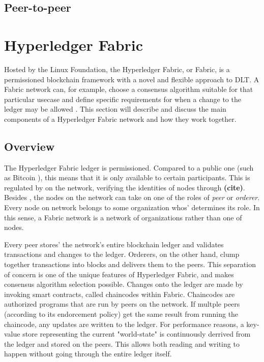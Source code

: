 \documentclass[english, biblatex, digitaloutput]{kththesis}
\begin{document}



\subsection{Peer-to-peer}






\section{Hyperledger Fabric}

Hosted by the Linux Foundation\cite{linux-foundation_projects_nodate}, the Hyperledger Fabric, or Fabric, is a permissioned blockchain framework with a novel and flexible approach to \gls{DLT}. A Fabric network can, for example, choose a consensus algorithm suitable for that particular usecase and define specific requirements for when a change to the ledger may be allowed \cite{androulaki_hyperledger_2018}. This section will describe and discuss the main components of a Hyperledger Fabric network and how they work together.

\subsection{Overview}

The Hyperledger Fabric ledger is permissioned. Compared to a public one (such as Bitcoin \cite{nakamoto_bitcoin_nodate}), this means that it is only available to certain participants. This is regulated by  on the network, verifying the identities of nodes through  \textbf{(cite)}. Besides , the nodes on the network can take on one of the roles of \textit{peer} or \textit{orderer}. Every node on network belongs to some organization whos'  determines its role. In this sense, a Fabric network is a network of organizations rather than one of nodes.

Every peer stores' the network's entire blockchain ledger and validates transactions and changes to the ledger. Orderers, on the other hand, clump together transactions into blocks and delivers them to the peers. This separation of concern is one of the unique features of Hyperledger Fabric, and makes consensus algorithm selection possible. Changes onto the ledger are made by invoking smart contracts, called chaincodes within Fabric. Chaincodes are authorized programs that are run by peers on the network. If multple peers (according to its endorcement policy) get the same result from running the chaincode, any updates are written to the ledger. For performance reasons, a key-value store representing the current "world-state" is continuously derrived from the ledger and stored on the peers. This allows both reading and writing to happen without going through the entire ledger itself.
\end{document}
